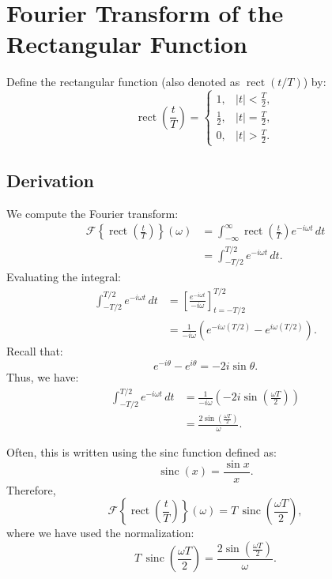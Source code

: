 \documentclass[11pt]{article}
\begin{document}
\newpage

\section{Fourier Transform of the Rectangular Function}

Define the rectangular function (also denoted as \(\operatorname{rect}(t/T)\)) by:
\begin{equation}
    \operatorname{rect}\left(\frac{t}{T}\right) =
    \begin{cases}
        1, & |t| < \frac{T}{2}, \\
        \frac{1}{2}, & |t| = \frac{T}{2}, \\
        0, & |t| > \frac{T}{2}.
    \end{cases}
\end{equation}

\subsection*{Derivation}
We compute the Fourier transform:
\begin{align}
    \mathcal{F}\left\{\operatorname{rect}\left(\frac{t}{T}\right)\right\}(\omega)
    &= \int_{-\infty}^{\infty} \operatorname{rect}\left(\frac{t}{T}\right) e^{-i\omega t}\, dt \\
    &= \int_{-T/2}^{T/2} e^{-i\omega t}\, dt.
\end{align}
Evaluating the integral:
\begin{align}
    \int_{-T/2}^{T/2} e^{-i\omega t}\, dt 
    &= \left[ \frac{e^{-i\omega t}}{-i\omega} \right]_{t=-T/2}^{T/2} \\
    &= \frac{1}{-i\omega} \left( e^{-i\omega (T/2)} - e^{i\omega (T/2)} \right).
\end{align}
Recall that:
\[
e^{-i\theta} - e^{i\theta} = -2i\sin\theta.
\]
Thus, we have:
\begin{align}
    \int_{-T/2}^{T/2} e^{-i\omega t}\, dt 
    &= \frac{1}{-i\omega} \left( -2i\sin\left(\frac{\omega T}{2}\right) \right) \\
    &= \frac{2\sin\left(\frac{\omega T}{2}\right)}{\omega}.
\end{align}

Often, this is written using the sinc function defined as:
\[
\operatorname{sinc}(x) = \frac{\sin x}{x}.
\]
Therefore,
\begin{equation}
    \boxed{\mathcal{F}\left\{\operatorname{rect}\left(\frac{t}{T}\right)\right\}(\omega) = T\, \operatorname{sinc}\left(\frac{\omega T}{2}\right),}
\end{equation}
where we have used the normalization:
\[
T\, \operatorname{sinc}\left(\frac{\omega T}{2}\right) = \frac{2\sin\left(\frac{\omega T}{2}\right)}{\omega}.
\]
\end{document}
